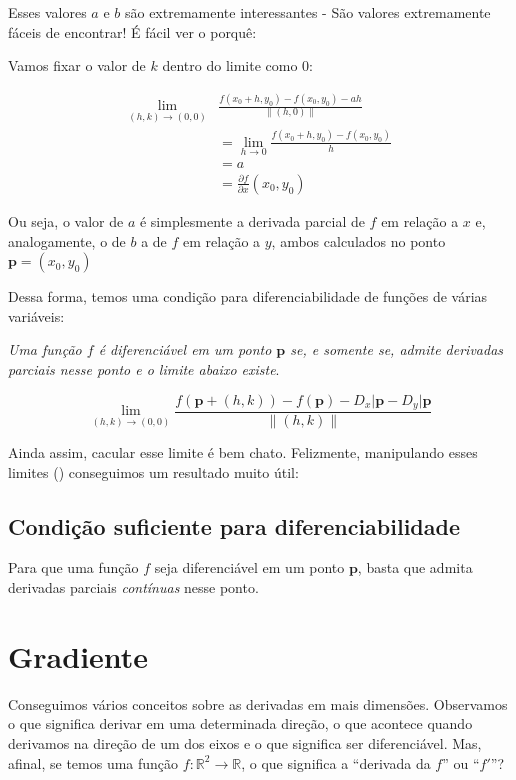 \documentclass[
  portuguese,
  letterpaper,
  DIV=11,
  numbers=noendperiod]{scrreport}
\begin{document}
Esses valores \(a\) e \(b\) são extremamente interessantes - São valores
extremamente fáceis de encontrar! É fácil ver o porquê:

Vamos fixar o valor de \(k\) dentro do limite como \(0\):

\[
\begin{aligned}
  \lim_{(h,k) \rightarrow (0,0)} &\frac{f(x_0+h, y_0) - f(x_0,y_0) - ah}{\lVert (h,0) \rVert} \\
  &= \lim_{h \rightarrow 0} \frac{f(x_0+h,y_0) - f(x_0,y_0)}{h} \\
  &= a \\
  &= \frac{\partial f}{\partial x} (x_0,y_0)
\end{aligned}
\]

Ou seja, o valor de \(a\) é simplesmente a derivada parcial de \(f\) em
relação a \(x\) e, analogamente, o de \(b\) a de \(f\) em relação a
\(y\), ambos calculados no ponto \(\pmb{p} = (x_0,y_0)\)

Dessa forma, temos uma condição para diferenciabilidade de funções de
várias variáveis:

\emph{Uma função \(f\) é diferenciável em um ponto \(\pmb{p}\) se, e
somente se, admite derivadas parciais nesse ponto e o limite abaixo
existe}.

\[
\lim_{(h,k) \rightarrow (0,0)}
\frac{f(\pmb{p} + (h,k)) - f(\pmb{p}) - D_x\rvert{\pmb{p}} - D_y\rvert{\pmb{p}}}{\lVert (h,k) \rVert}
\]

Ainda assim, cacular esse limite é bem chato. Felizmente, manipulando
esses limites (\textcite{guidorizzi_um_2018}) conseguimos um resultado
muito útil:

\subsection{Condição suficiente para
diferenciabilidade}\label{condiuxe7uxe3o-suficiente-para-diferenciabilidade}

Para que uma função \(f\) seja diferenciável em um ponto \(\pmb{p}\),
basta que admita derivadas parciais \emph{contínuas} nesse ponto.

\section{Gradiente}\label{gradiente}

Conseguimos vários conceitos sobre as derivadas em mais dimensões.
Observamos o que significa derivar em uma determinada direção, o que
acontece quando derivamos na direção de um dos eixos e o que significa
ser diferenciável. Mas, afinal, se temos uma função
\(f : \mathbb{R}^2 \rightarrow \mathbb{R}\), o que significa a
``derivada da \(f\)'' ou ``\(f'\)''?
\end{document}
